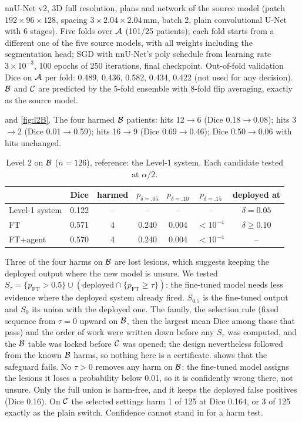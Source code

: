  nnU-Net v2, 3D full resolution, plans and network of the source model (patch $192\times96\times128$, spacing $3\times2.04\times2.04$\,mm, batch 2, plain convolutional U-Net with 6 stages). Five folds over $\mathcal{A}$ (101/25 patients); each fold starts from a different one of the five source models, with all weights including the segmentation head; SGD with nnU-Net's poly schedule from learning rate $3\times10^{-3}$, 100 epochs of 250 iterations, final checkpoint. Out-of-fold validation Dice on $\mathcal{A}$ per fold: 0.489, 0.436, 0.582, 0.434, 0.422 (not used for any decision). $\mathcal{B}$ and $\mathcal{C}$ are predicted by the 5-fold ensemble with 8-fold flip averaging, exactly as the source model.

  and \cref{fig:l2B}. The four harmed $\mathcal{B}$ patients: hits 12$\to$6 (Dice 0.18$\to$0.08); hits 3$\to$2 (Dice 0.01$\to$0.59); hits 16$\to$9 (Dice 0.69$\to$0.46); Dice 0.50$\to$0.06 with hits unchanged.

\begin{table}[h]
\centering
\caption{Level 2 on $\mathcal{B}$ ($n=126$), reference: the Level-1 system. Each candidate tested at $\alpha/2$.}
\label{tab:supp_l2b}
\footnotesize
\setlength{\tabcolsep}{2.4pt}
\begin{tabular}{@{}lcccccc@{}}
\toprule
 & Dice & harmed & $p_{\delta=.05}$ & $p_{\delta=.10}$ & $p_{\delta=.15}$ & deployed at \\
\midrule
Level-1 system & 0.122 & -- & -- & -- & -- & $\delta=0.05$ \\
FT & 0.571 & 4 & 0.240 & 0.004 & $<10^{-4}$ & $\delta\ge0.10$ \\
FT+agent & 0.570 & 4 & 0.240 & 0.004 & $<10^{-4}$ & -- \\
\bottomrule
\end{tabular}
\end{table}

 Three of the four harms on $\mathcal{B}$ are lost lesions, which suggests keeping the deployed output where the new model is unsure. We tested $S_\tau=\{p_{\mathrm{FT}}>0.5\}\cup(\text{deployed}\cap\{p_{\mathrm{FT}}\ge\tau\})$: the fine-tuned model needs less evidence where the deployed system already fired. $S_{0.5}$ is the fine-tuned output and $S_0$ its union with the deployed one. The family, the selection rule (fixed sequence from $\tau=0$ upward on $\mathcal{B}$, then the largest mean Dice among those that pass) and the order of work were written down before any $S_\tau$ was computed, and the $\mathcal{B}$ table was locked before $\mathcal{C}$ was opened; the design nevertheless followed from the known $\mathcal{B}$ harms, so nothing here is a certificate.  shows that the safeguard fails. No $\tau>0$ removes any harm on $\mathcal{B}$: the fine-tuned model assigns the lesions it loses a probability below 0.01, so it is confidently wrong there, not unsure. Only the full union is harm-free, and it keeps the deployed false positives (Dice 0.16). On $\mathcal{C}$ the selected settings harm 1 of 125 at Dice 0.164, or 3 of 125 exactly as the plain switch. Confidence cannot stand in for a harm test.

